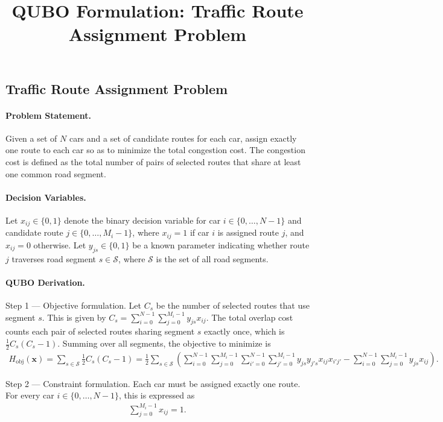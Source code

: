 \documentclass[12pt]{article}
\title{QUBO Formulation: Traffic Route Assignment Problem}
\date{}
\begin{document}
\maketitle

\subsection*{Traffic Route Assignment Problem}

\paragraph{Problem Statement.}
Given a set of $N$ cars and a set of candidate routes for each car, assign exactly one route to each car so as to minimize the total congestion cost. The congestion cost is defined as the total number of pairs of selected routes that share at least one common road segment.

\paragraph{Decision Variables.}
Let $x_{ij} \in \{0,1\}$ denote the binary decision variable for car $i \in \{0, \dots, N-1\}$ and candidate route $j \in \{0, \dots, M_i-1\}$, where $x_{ij} = 1$ if car $i$ is assigned route $j$, and $x_{ij} = 0$ otherwise. Let $y_{js} \in \{0,1\}$ be a known parameter indicating whether route $j$ traverses road segment $s \in \mathcal{S}$, where $\mathcal{S}$ is the set of all road segments.

\paragraph{QUBO Derivation.}
Step 1 --- Objective formulation. Let $C_s$ be the number of selected routes that use segment $s$. This is given by $C_s = \sum_{i=0}^{N-1} \sum_{j=0}^{M_i-1} y_{js} x_{ij}$. The total overlap cost counts each pair of selected routes sharing segment $s$ exactly once, which is $\frac{1}{2} C_s (C_s - 1)$. Summing over all segments, the objective to minimize is
\begin{align}
H_{\text{obj}}(\mathbf{x}) = \sum_{s \in \mathcal{S}} \frac{1}{2} C_s (C_s - 1) = \frac{1}{2} \sum_{s \in \mathcal{S}} \left( \sum_{i=0}^{N-1} \sum_{j=0}^{M_i-1} \sum_{i'=0}^{N-1} \sum_{j'=0}^{M_i-1} y_{js} y_{j's} x_{ij} x_{i'j'} - \sum_{i=0}^{N-1} \sum_{j=0}^{M_i-1} y_{js} x_{ij} \right).
\end{align}

Step 2 --- Constraint formulation. Each car must be assigned exactly one route. For every car $i \in \{0, \dots, N-1\}$, this is expressed as
\begin{align}
\sum_{j=0}^{M_i-1} x_{ij} = 1.
\end{align}
\end{document}
